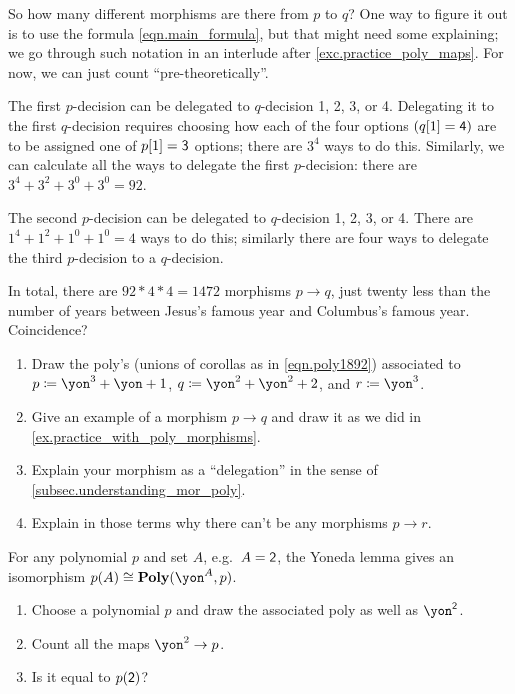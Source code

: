 \documentclass[DynamicalBook]{subfiles}
\begin{document}
\begin{example}
So how many different morphisms are there from $p$ to $q$? One way to figure it out is to use the formula \eqref{eqn.main_formula}, but that might need some explaining; we go through such notation in an interlude after \cref{exc.practice_poly_maps}. For now, we can just count ``pre-theoretically''.

The first $p$-decision can be delegated to $q$-decision 1, 2, 3, or 4. Delegating it to the first $q$-decision requires choosing how each of the four options $(q[1]=\textsf{4})$ are to be assigned one of $p[1]=\textsf{3}$ options; there are $3^4$ ways to do this. Similarly, we can calculate all the ways to delegate the first $p$-decision: there are $3^4+3^2+3^0+3^0=92$. 

The second $p$-decision can be delegated to $q$-decision 1, 2, 3, or 4. There are $1^4+1^2+1^0+1^0=4$ ways to do this; similarly there are four ways to delegate the third $p$-decision to a $q$-decision.

In total, there are $92*4*4=1472$ morphisms $p\to q$, just twenty less than the number of years between Jesus's famous year and Columbus's famous year. Coincidence? 
\end{example}

\begin{exercise}\label{exc.practice_poly_maps}
\begin{enumerate}
	\item Draw the poly's (unions of corollas as in \cref{eqn.poly1892}) associated to $p\coloneqq\yon^3+\yon+1$, $q\coloneqq \yon^2+\yon^2+2$, and $r\coloneqq\yon^3$.
	\item Give an example of a morphism $p\to q$ and draw it as we did in \cref{ex.practice_with_poly_morphisms}.
	\item Explain your morphism as a ``delegation'' in the sense of \cref{subsec.understanding_mor_poly}.
	\item Explain in those terms why there can't be any morphisms $p\to r$.
\qedhere
\end{enumerate}
\end{exercise}

\begin{exercise}
For any polynomial $p$ and set $A$, e.g.\ $A=\textsf{2}$, the Yoneda lemma gives an isomorphism $p(A)\cong \poly(\yon^A,p)$.
\begin{enumerate}
	\item Choose a polynomial $p$ and draw the associated poly as well as $\yon^\2$.
	\item Count all the maps $\yon^2\to p$.
	\item Is it equal to $p(\textsf{2})$?
\qedhere
\end{enumerate}
\end{exercise}
\end{document}
